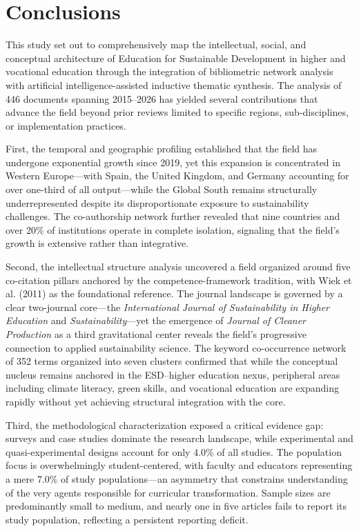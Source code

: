 \documentclass[pdflatex,sn-basic]{sn-jnl}%
\begin{document}

\section{Conclusions}
\label{sec:conclusiones}

This study set out to comprehensively map the intellectual, social, and conceptual architecture of Education for Sustainable Development in higher and vocational education through the integration of bibliometric network analysis with artificial intelligence-assisted inductive thematic synthesis. The analysis of 446 documents spanning 2015--2026 has yielded several contributions that advance the field beyond prior reviews limited to specific regions, sub-disciplines, or implementation practices.

First, the temporal and geographic profiling established that the field has undergone exponential growth since 2019, yet this expansion is concentrated in Western Europe---with Spain, the United Kingdom, and Germany accounting for over one-third of all output---while the Global South remains structurally underrepresented despite its disproportionate exposure to sustainability challenges. The co-authorship network further revealed that nine countries and over 20\% of institutions operate in complete isolation, signaling that the field's growth is extensive rather than integrative.

Second, the intellectual structure analysis uncovered a field organized around five co-citation pillars anchored by the competence-framework tradition, with Wiek et al. (2011) as the foundational reference. The journal landscape is governed by a clear two-journal core---the \textit{International Journal of Sustainability in Higher Education} and \textit{Sustainability}---yet the emergence of \textit{Journal of Cleaner Production} as a third gravitational center reveals the field's progressive connection to applied sustainability science. The keyword co-occurrence network of 352 terms organized into seven clusters confirmed that while the conceptual nucleus remains anchored in the ESD--higher education nexus, peripheral areas including climate literacy, green skills, and vocational education are expanding rapidly without yet achieving structural integration with the core.

Third, the methodological characterization exposed a critical evidence gap: surveys and case studies dominate the research landscape, while experimental and quasi-experimental designs account for only 4.0\% of all studies. The population focus is overwhelmingly student-centered, with faculty and educators representing a mere 7.0\% of study populations---an asymmetry that constrains understanding of the very agents responsible for curricular transformation. Sample sizes are predominantly small to medium, and nearly one in five articles fails to report its study population, reflecting a persistent reporting deficit.
\end{document}
